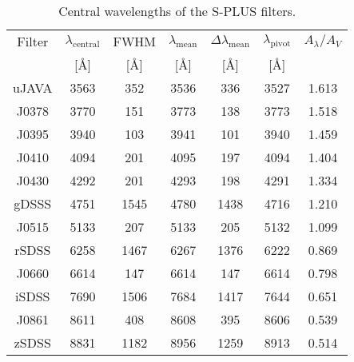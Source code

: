 \begin{table*}
\centering
\caption{Central wavelengths of the S-PLUS filters.}
\label{tab:central_wavelengths}
\begin{tabular}{ccccccc}
\hline
\hline
Filter & $\lambda_{\mathrm{central}}$ & FWHM & $\lambda_{\mathrm{mean}}$ & $\Delta\lambda_{\mathrm{mean}}$ & $\lambda_{\mathrm{pivot}}$ & $A_{\lambda}/A_{V}$ \\
 & [\AA] & [\AA] & [\AA] & [\AA] & [\AA] & \\
\hline
uJAVA & 3563 & 352 & 3536 & 336 & 3527 & 1.613\\
J0378 & 3770 & 151 & 3773 & 138 & 3773 & 1.518\\
J0395 & 3940 & 103 & 3941 & 101 & 3940 & 1.459\\
J0410 & 4094 & 201 & 4095 & 197 & 4094 & 1.404\\
J0430 & 4292 & 201 & 4293 & 198 & 4291 & 1.334\\
gDSSS & 4751 & 1545 & 4780 & 1438 & 4716 & 1.210\\
J0515 & 5133 & 207 & 5133 & 205 & 5132 & 1.099\\
rSDSS & 6258 & 1467 & 6267 & 1376 & 6222 & 0.869\\
J0660 & 6614 & 147 & 6614 & 147 & 6614 & 0.798\\
iSDSS & 7690 & 1506 & 7684 & 1417 & 7644 & 0.651\\
J0861 & 8611 & 408 & 8608 & 395 & 8606 & 0.539\\
zSDSS & 8831 & 1182 & 8956 & 1259 & 8913 & 0.514\\
\hline
\end{tabular}
\end{table*}
